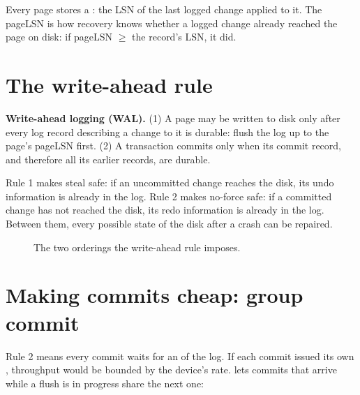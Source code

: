 Every page stores a : the LSN of the last logged change applied to
it. The pageLSN is how recovery knows whether a logged change already reached
the page on disk: if pageLSN $\ge$ the record's LSN, it did.

\section{The write-ahead rule}

\begin{keyidea}
\textbf{Write-ahead logging (WAL).} (1) A page may be written to disk only after
every log record describing a change to it is durable: flush the log up to the
page's pageLSN first. (2) A transaction commits only when its commit record, and
therefore all its earlier records, are durable.
\end{keyidea}

Rule 1 makes steal safe: if an uncommitted change reaches the disk, its undo
information is already in the log. Rule 2 makes no-force safe: if a committed
change has not reached the disk, its redo information is already in the log.
Between them, every possible state of the disk after a crash can be repaired.

\begin{figure}[ht]
\centering
{}
\caption{The two orderings the write-ahead rule imposes.}
\label{fig:wal}
\end{figure}

\section{Making commits cheap: group commit}

Rule 2 means every commit waits for an  of the log. If each commit
issued its own , throughput would be bounded by the device's
 rate.  lets commits that arrive while a flush is
in progress share the next one:

